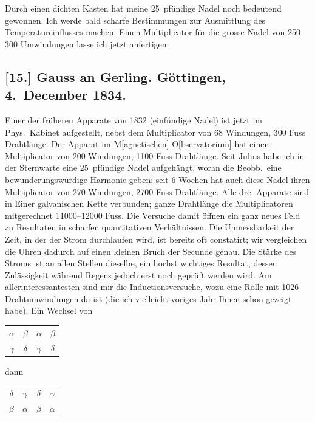 \documentclass[12pt,a4paper]{article}
\begin{document}
Durch einen dichten Kasten hat meine 25~pf\"undige Nadel noch bedeutend gewonnen. Ich werde bald scharfe Bestimmungen zur Ausmittlung des Temperatureinflusses machen. Einen Multiplicator f\"ur die grosse Nadel von 250--300 Umwindungen lasse ich jetzt anfertigen.\dotfill

\subsection*{[15.] Gauss an Gerling. G\"ottingen, 4.~December 1834.}

Einer der fr\"uheren Apparate von 1832 (einf\'{u}ndige Nadel) ist jetzt im Phys.~Kabinet aufgestellt, nebst dem Multiplicator von 68 Windungen, 300 Fuss Drahtl\"ange. Der Apparat im M[agnetischen] O[bservatorium] hat einen Multiplicator von 200 Windungen, 1100 Fuss Drahtl\"ange. Seit Julius habe ich in der Sternwarte eine 25~pf\"undige Nadel aufgeh\"angt, woran die Beobb.~eine bewunderungsw\"urdige Harmonie geben; seit 6 Wochen hat auch diese Nadel ihren Multiplicator von 270 Windungen, 2700 Fuss Drahtl\"ange. Alle drei Apparate sind in Einer galvanischen Kette verbunden; ganze Drahtl\"ange die Multiplicatoren mitgerechnet 11000--12000 Fuss. Die Versuche damit \"offnen ein ganz neues Feld zu Resultaten in scharfen quantitativen Verh\"altnissen. Die Unmessbarkeit der Zeit, in der der Strom durchlaufen wird, ist bereits oft constatirt; wir vergleichen die Uhren dadurch auf einen kleinen Bruch der Secunde genau. Die St\"arke des Stroms ist an allen Stellen dieselbe, ein h\"ochst wichtiges Resultat, dessen Zul\"assigkeit w\"ahrend Regens jedoch erst noch gepr\"uft werden wird. Am allerinteressantesten sind mir die Inductionsversuche, wozu eine Rolle mit 1026 Drahtumwindungen da ist (die ich vielleicht voriges Jahr Ihnen schon gezeigt habe). Ein Wechsel von
\begin{center}
\begin{tabular}{cccc}
$\alpha$ & $\beta$ & $\alpha$ & $\beta$ \\
$\gamma$ & $\delta$ & $\gamma$ & $\delta$
\end{tabular}
\end{center}
dann
\begin{center}
\begin{tabular}{cccc}
$\delta$ & $\gamma$ & $\delta$ & $\gamma$ \\
$\beta$ & $\alpha$ & $\beta$ & $\alpha$
\end{tabular}
\end{center}
\end{document}
